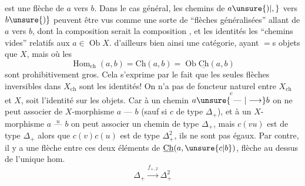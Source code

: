 

est une flèche de $a$ vers $b$. Dans le cas général, les chemins de $a\unsure{)|,}$ vers $b\unsure{)}$ peuvent être vus comme une sorte de ``flèches généralisées'' allant de $a$ vers $b$, dont la composition  serait la composition , et les identités les ``chemins vides'' relatifs aux $a\in\operatorname{Ob}X$.  d'ailleurs bien ainsi une catégorie, ayant $=$s objets que $X$, mais où les
\[
\operatorname{Hom}_{\mathrm{ch}}(a,b)=\mathrm{Ch}(a,b)=\operatorname{Ob}\underline{\mathrm{Ch}}(a,b)
\]
sont prohibitivement gros.  Cela s'exprime  par le fait que les seules flèches inversibles dans $X_{\mathrm{ch}}$ sont les identités! On n'a pas de foncteur naturel entre $X_{\mathrm{ch}}$ et $X$,  soit l'identité sur les objets. Car à un chemin $a\overset{c}{\unsure{\text{ --- }|\longrightarrow}}b$ on ne peut associer de $X$-morphisme $a\text{ --- }b$ (sauf si $c$ de type $\Delta_+$), et à un $X$-morphisme $a\overset{u}{\text{ --- }}b$ on peut associer un chemin  de type $\Delta_+$, mais   $c(vu)$ est  de type $\Delta_+$ alors que $c(v)c(u)$ est de type $\Delta_+^2$, ils ne sont pas égaux. Par contre, il y a une flèche  entre ces deux  éléments de $\underline{\mathrm{Ch}}(a,\unsure{c|b})$, flèche au dessus de  l'unique hom.
\[
\Delta_+\xrightarrow{f_{+,2}}\Delta_+^2
\]
